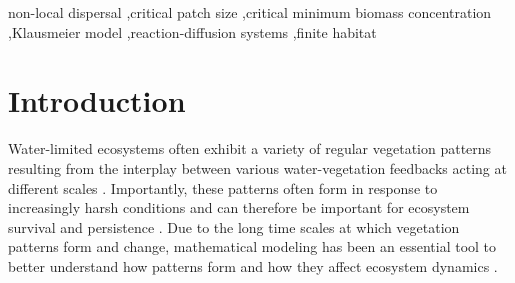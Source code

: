 \documentclass[preprint,12pt]{elsarticle}
\theoremstyle{plain}
\theoremstyle{definition}
\theoremstyle{remark}
\begin{document}
\begin{frontmatter}
\begin{abstract}
\end{abstract}

\begin{keyword}
non-local dispersal \sep critical patch size \sep critical minimum biomass concentration \sep Klausmeier model \sep reaction-diffusion systems \sep finite habitat
\end{keyword}

\end{frontmatter}


\section{Introduction}




Water-limited ecosystems often exhibit a variety of regular vegetation patterns \cite{Rietkerk2008,Tarnita2024,Martinez-Garcia2022} resulting from the interplay between various water-vegetation feedbacks acting at different scales \cite{Borgogno2009,Martinez-Garcia2014,Meron2018}. Importantly, these patterns often form in response to increasingly harsh conditions and can therefore be important for ecosystem survival and persistence \cite{Meron2016}. Due to the long time scales at which vegetation patterns form and change, mathematical modeling has been an essential tool to better understand how patterns form and how they affect ecosystem dynamics \cite{Meron2016,Martinez-Garcia2023}. 
\end{document}
